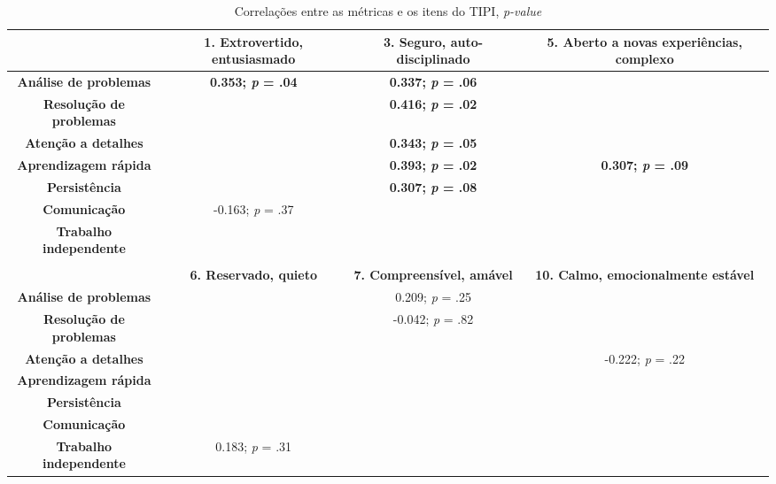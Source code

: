 \begin{sidewaystable}[ph!]
\footnotesize
\caption{\small Correlações entre as métricas e os itens do TIPI, \textsl{p-value}}
\renewcommand{\arraystretch}{1.4} 
\centering
\begin{tabular}{lccc}

    \toprule
          & \textbf{1. Extrovertido, entusiasmado} & \textbf{3. Seguro, auto-disciplinado} & \textbf{5. Aberto a novas experiências, complexo} \\
    \midrule
    \multicolumn{1}{c}{\textbf{Análise de problemas}} 	& \textbf{0.353; \textsl{p} = .04}  & \textbf{0.337; \textsl{p} = .06} & \textbf{} \\
    \multicolumn{1}{c}{\textbf{Resolução de problemas}} &																	  & \textbf{0.416; \textsl{p} = .02} & \textbf{} \\
    \multicolumn{1}{c}{\textbf{Atenção a detalhes}} 		&																		& \textbf{0.343; \textsl{p} = .05} & \\
    \multicolumn{1}{c}{\textbf{Aprendizagem rápida}} 		&																		& \textbf{0.393; \textsl{p} = .02} & \textbf{0.307; \textsl{p} = .09} \\
    \multicolumn{1}{c}{\textbf{Persistência}} 					&																		& \textbf{0.307; \textsl{p} = .08} & \\
    \multicolumn{1}{c}{\textbf{Comunicação}} 						& -0.163; \textsl{p} = .37					&																	 &  \\
    \multicolumn{1}{c}{\textbf{Trabalho independente}} 	&																		&																	 &  \\
		
          &  &  &  \\

		\toprule					
          & \textbf{6. Reservado, quieto} & \textbf{7. Compreensível, amável} & \textbf{10. Calmo, emocionalmente estável} \\
		\midrule			
    \multicolumn{1}{c}{\textbf{Análise de problemas}} 	&													& 0.209;  \textsl{p} = .25 &  \\
    \multicolumn{1}{c}{\textbf{Resolução de problemas}} &													& -0.042; \textsl{p} = .82 &  \\
    \multicolumn{1}{c}{\textbf{Atenção a detalhes}} 		&													&       									 & -0.222; \textsl{p} = .22 \\
    \multicolumn{1}{c}{\textbf{Aprendizagem rápida}} 		&													&       									 &  \\
    \multicolumn{1}{c}{\textbf{Persistência}} 					&													&       									 &  \\
    \multicolumn{1}{c}{\textbf{Comunicação}} 						&													&       									 &  \\
    \multicolumn{1}{c}{\textbf{Trabalho independente}}	& 0.183; \textsl{p} = .31 &       									 &  \\
		

\end{tabular}
\end{sidewaystable}
